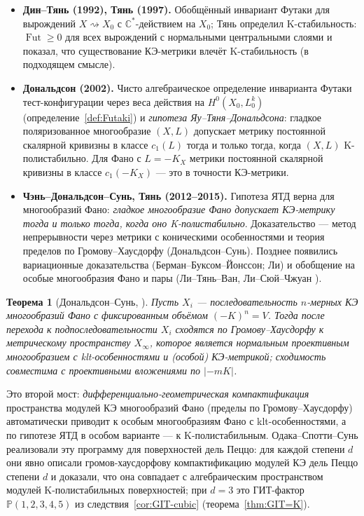 \documentclass[11pt,a4paper]{article}
\theoremstyle{plain}
\newtheorem{theorem}{Теорема}[section]
\theoremstyle{definition}
\theoremstyle{remark}
\renewcommand{\C}{\mathbb{C}}
\newcommand{\PP}{\mathbb{P}}
\DeclareMathOperator{\Fut}{Fut}
\begin{document}
\begin{itemize}
\item \textbf{Дин--Тянь (1992), Тянь (1997).} Обобщённый инвариант Футаки для вырождений
$X\rightsquigarrow X_0$ с $\C^*$-действием на $X_0$; Тянь определил K-стабильность: $\Fut\ge0$ для
всех вырождений с нормальными центральными слоями и показал, что существование КЭ-метрики влечёт
K-стабильность (в подходящем смысле).
\item \textbf{Дональдсон (2002).} Чисто алгебраическое определение инварианта Футаки
тест-конфигурации через веса действия на $H^0(X_0,L_0^k)$ (определение~\ref{def:Futaki}) и
\emph{гипотеза Яу--Тяня--Дональдсона}: гладкое поляризованное многообразие $(X,L)$ допускает
метрику постоянной скалярной кривизны в классе $c_1(L)$ тогда и только тогда, когда $(X,L)$
K-полистабильно. Для Фано с $L=-K_X$ метрики постоянной скалярной кривизны в классе $c_1(-K_X)$ ---
это в точности КЭ-метрики.
\item \textbf{Чэнь--Дональдсон--Сунь, Тянь (2012--2015).} Гипотеза ЯТД верна для многообразий Фано:
\emph{гладкое многообразие Фано допускает КЭ-метрику тогда и только тогда, когда оно K-полистабильно}.
Доказательство --- метод непрерывности через метрики с коническими особенностями и теория
пределов по Громову--Хаусдорфу (Дональдсон--Сунь). Позднее появились вариационные доказательства
(Берман--Буксом--Йонссон; Ли) и обобщение на особые многообразия Фано и пары
(Ли--Тянь--Ван, Ли--Сюй--Чжуан \cite{LXZ}).
\end{itemize}

\begin{theorem}[Дональдсон--Сунь, \cite{DS14}]\label{thm:DS}
Пусть $X_i$ --- последовательность $n$-мерных КЭ многообразий Фано с фиксированным объёмом
$(-K)^n=V$. Тогда после перехода к подпоследовательности $X_i$ сходятся по Громову--Хаусдорфу к
метрическому пространству $X_\infty$, которое является нормальным проективным многообразием с
klt-особенностями и (особой) КЭ-метрикой; сходимость совместима с проективными вложениями по $|-mK|$.
\end{theorem}

Это второй мост: \emph{дифференциально-геометрическая компактификация} пространства модулей КЭ
многообразий Фано (пределы по Громову--Хаусдорфу) автоматически приводит к особым многообразиям
Фано с klt-особенностями, а по гипотезе ЯТД в особом варианте --- к K-полистабильным. Одака--Спотти--Сунь
\cite{OSS} реализовали эту программу для поверхностей дель Пеццо: для каждой степени $d$ они явно
описали громов-хаусдорфову компактификацию модулей КЭ дель Пеццо степени $d$ и доказали, что она
совпадает с алгебраическим пространством модулей K-полистабильных поверхностей; при $d=3$ это
ГИТ-фактор $\PP(1,2,3,4,5)$ из следствия~\ref{cor:GIT-cubic} (теорема~\ref{thm:GIT=K}).
\end{document}
